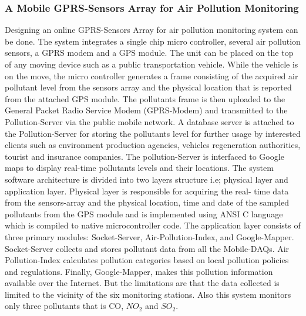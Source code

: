 \subsubsection{A Mobile GPRS-Sensors Array for Air Pollution Monitoring}
Designing an online GPRS-Sensors Array for air pollution monitoring system can be done. The system integrates a single chip micro controller, several air pollution sensors, a GPRS modem and a GPS module. The unit can be placed on the top of any moving device such as a public transportation vehicle. While the vehicle is on the move, the micro controller generates a frame consisting of the acquired air pollutant level from the sensors array and the physical location that is reported from the attached GPS module. The pollutants frame is then uploaded to the General Packet Radio Service Modem (GPRS-Modem) and transmitted to the Pollution-Server via the public mobile network. A database server is attached to the Pollution-Server for storing the pollutants level for further usage by interested clients such as environment production agencies, vehicles regeneration authorities, tourist and insurance companies. The pollution-Server is interfaced to Google maps to display real-time pollutants levels and their locations. The system software architecture is divided into two layers structure i.e; physical layer and application layer. Physical layer is responsible for acquiring the real- time data from the sensors-array and the physical location, time and date of the sampled pollutants from the GPS module and is implemented using ANSI C language which is compiled to native microcontroller code. The application layer consists of three primary modules: Socket-Server, Air-Pollution-Index, and Google-Mapper. Socket-Server collects and stores pollutant data from all the Mobile-DAQs. Air Pollution-Index calculates pollution categories based on local pollution policies and regulations. Finally, Google-Mapper, makes this pollution information available over the Internet. But the limitations are that the data collected is limited to the vicinity of the six monitoring stations. Also this system monitors only three pollutants that is CO, $NO_2$ and $SO_2$.

